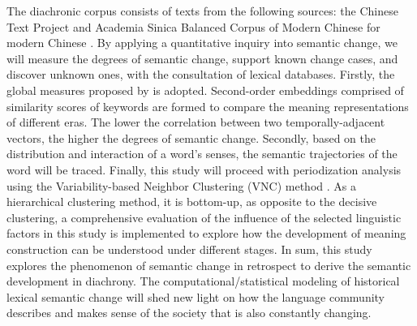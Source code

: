 The diachronic corpus consists of texts from the following sources: the Chinese Text Project \parencite{sturgeon2019ctext} and Academia Sinica Balanced Corpus of Modern Chinese for modern Chinese \parencite{chen1996sinica}. By applying a quantitative inquiry into semantic change, we will measure the degrees of semantic change, support known change cases, and discover unknown ones, with the consultation of lexical databases. Firstly, the global measures proposed by \textcite{hamilton2016cultural} is adopted. Second-order embeddings comprised of similarity scores of keywords are formed to compare the meaning representations of different eras. The lower the correlation between two temporally-adjacent vectors, the higher the degrees of semantic change. Secondly, based on the distribution and interaction of a word's senses, the semantic trajectories of the word will be traced. Finally, this study will proceed with periodization analysis using the Variability-based Neighbor Clustering (VNC) method \parencite{gries2012variability}. As a hierarchical clustering method, it is bottom-up, as opposite to the decisive clustering, a comprehensive evaluation of the influence of the selected linguistic factors in this study is implemented to explore how the development of meaning construction can be understood under different stages. In sum, this study explores the phenomenon of semantic change in retrospect to derive the semantic development in diachrony. The computational/statistical modeling of historical lexical semantic change will shed new light on how the language community describes and makes sense of the society that is also constantly changing.\\


